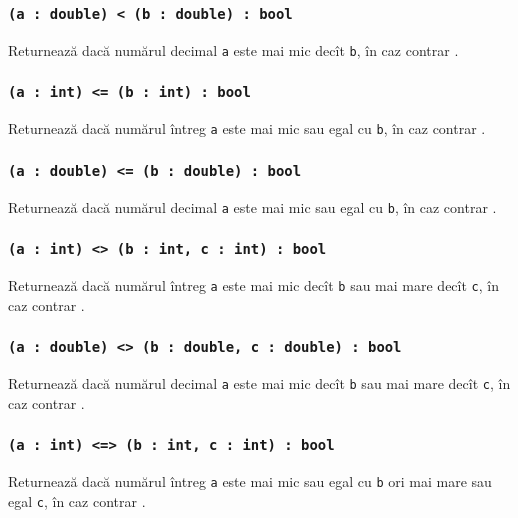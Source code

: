 \subsubsection{\texttt{(a : double) < (b : double) : bool}}

Returnează \true{} dacă numărul decimal \texttt{a} este mai mic decît \texttt{b}, în caz contrar \false{}.

\subsubsection{\texttt{(a : int) <= (b : int) : bool}}

Returnează \true{} dacă numărul întreg \texttt{a} este mai mic sau egal cu \texttt{b}, în caz contrar \false{}.

\subsubsection{\texttt{(a : double) <= (b : double) : bool}}

Returnează \true{} dacă numărul decimal \texttt{a} este mai mic sau egal cu \texttt{b}, în caz contrar \false{}.

\subsubsection{\texttt{(a : int) <> (b : int, c : int) : bool}}

Returnează \true{} dacă numărul întreg \texttt{a} este mai mic decît \texttt{b} sau mai mare decît \texttt{c}, în caz contrar \false{}.

\subsubsection{\texttt{(a : double) <> (b : double, c : double) : bool}}

Returnează \true{} dacă numărul decimal \texttt{a} este mai mic decît \texttt{b} sau mai mare decît \texttt{c}, în caz contrar \false{}.

\subsubsection{\texttt{(a : int) <=> (b : int, c : int) : bool}}

Returnează \true{} dacă numărul întreg \texttt{a} este mai mic sau egal cu \texttt{b} ori mai mare sau egal \texttt{c}, în caz contrar \false{}.

